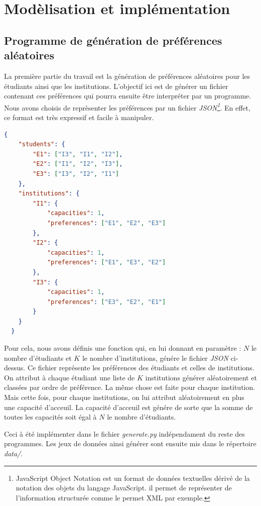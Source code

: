 \documentclass[12pt,titlepage]{article}
\begin{document}
\section{Modèlisation et implémentation}

\subsection{Programme de génération de préférences aléatoires}

La première partie du travail est la génération de préférences aléatoires pour les étudiants ainsi que les institutions. L'objectif ici est de générer un fichier contenant ces préférences qui pourra ensuite être interpréter par un programme. Nous avons choisis de reprèsenter les préférences par un fichier \textit{JSON\footnote{JavaScript Object Notation est un format de données textuelles dérivé de la notation des objets du langage JavaScript. il permet de représenter de l’information structurée comme le permet XML par exemple.}}. En effet, ce format est très expressif et facile à manipuler.

\newpage

\begin{lstlisting}[language=json, caption="Exemple d'un fichier de préférences"]
  {
    "students": {
        "E1": ["I3", "I1", "I2"],
        "E2": ["I1", "I2", "I3"],
        "E3": ["I3", "I2", "I1"]
    },
    "institutions": {
        "I1": {
            "capacities": 1,
            "preferences": ["E1", "E2", "E3"]
        },
        "I2": {
            "capacities": 1,
            "preferences": ["E1", "E3", "E2"]
        },
        "I3": {
            "capacities": 1,
            "preferences": ["E3", "E2", "E1"]
        }
    }
  }
\end{lstlisting}

Pour cela, nous avons définis une fonction qui, en lui donnant en paramètre : $N$ le nombre d'étudiants et $K$ le nombre d'institutions, génére le fichier \textit{JSON} ci-dessus. Ce fichier représente les préférences des étudiants et celles de institutions. On attribut à chaque étudiant une liste de $K$ institutions générer aléatoirement et classées par ordre de préférence. La même chose est faite pour chaque institution. Mais cette fois, pour chaque institutions, on lui attribut aléatoirement en plus une capacité d'acceuil. La capacité d'acceuil est génére de sorte que la somme de toutes les capacités soit égal à $N$ le nombre d'étudiants.

Ceci à été implémenter dans le fichier \textit{generate.py} indépendament du reste des programmes. Les jeux de données ainsi générer sont ensuite mis dans le répertoire \textit{data/}.
\end{document}
